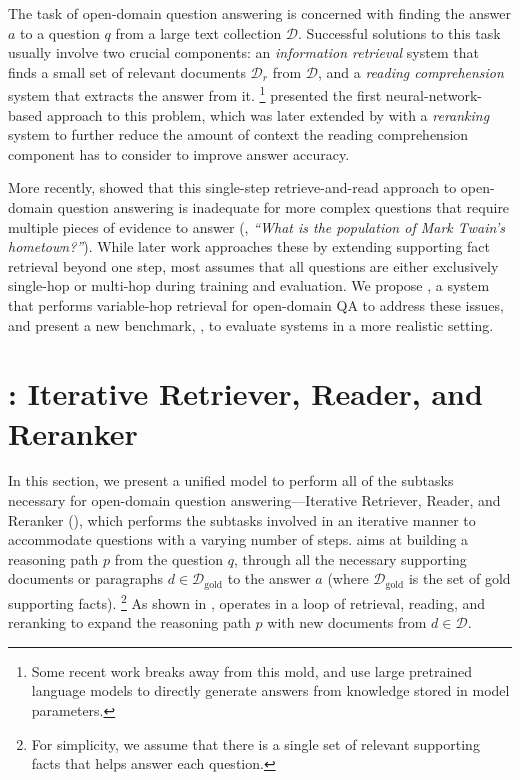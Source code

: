 The task of open-domain question answering is concerned with finding the answer $a$ to a question $q$ from a large text collection $\mathcal D$.
Successful solutions to this task usually involve two crucial components: an \emph{information retrieval} system that finds a small set of relevant documents $\mathcal D_r$ from $\mathcal D$, and a \emph{reading comprehension} system that extracts the answer from it.%
\footnote{Some recent work breaks away from this mold, and use large pretrained language models \citep[\eg, T5; ][]{raffel2020t5} to directly generate answers from knowledge stored in model parameters.}
\citet{chen2017reading} presented the first neural-network-based approach to this problem, which was later extended by \citet{wang2018reinforced} with a \emph{reranking} system to further reduce the amount of context the reading comprehension component has to consider to improve answer accuracy.

More recently, \citet{yang2018hotpotqa} showed that this single-step retrieve-and-read approach to open-domain question answering is inadequate for more complex questions that require multiple pieces of evidence to answer (\eg, \emph{``What is the population of Mark Twain's hometown?''}).
While later work approaches these by extending supporting fact retrieval beyond one step, most assumes that all questions are either exclusively single-hop or multi-hop during training and evaluation.
We propose \irrr{}, a system that performs variable-hop retrieval for open-domain QA to address these issues, and present a new benchmark, \beerqa{}, to evaluate systems in a more realistic setting.

\section{\irrr{}: Iterative Retriever, Reader, and Reranker}

In this section, we present a unified model to perform all of the subtasks necessary for open-domain question answering---Iterative Retriever, Reader, and Reranker (\irrr{}), which performs the subtasks involved in an iterative manner to accommodate questions with a varying number of steps.
\irrr{} aims at building a reasoning path $p$ from the question $q$, through all the necessary supporting documents or paragraphs $d\in \mathcal{D}_{\text{gold}}$ to the answer $a$ (where $\mathcal{D}_{\text{gold}}$ is the set of gold supporting facts).%
\footnote{For simplicity, we assume that there is a single set of relevant supporting facts that helps answer each question.}
As shown in , \irrr{} operates in a loop of retrieval, reading, and reranking to expand the reasoning path $p$ with new documents from $d\in \mathcal{D}$.

